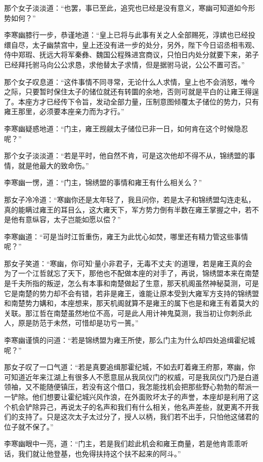 那个女子淡淡道：“也罢，事已至此，追究也已经是没有意义，寒幽可知道如今形势如何？”

李寒幽膝行一步，恭谨地道：“皇上已将与此事有关之人全部赐死，淳嫔也已经投缳自尽，太子幽禁宫中，皇上还没有进一步的处分，另外，陛下今日诏丞相韦观、侍中郑瑕、抚远大将军秦彝、魏国公程殊进宫商议，只怕日内处分就要下来，弟子已经拜托驸马向公公求恳，求他替太子求情，但是据驸马说，公公不置可否。”

那个女子叹息道：“这件事情不同寻常，无论什么人求情，皇上也不会消怒，唯今之际，只要暂时保住太子的储位就还有转圜的余地，否则可就是平白的让雍王得逞了。本座方才已经传下令旨，发动全部力量，压制意图倾覆太子储位的势力，只有雍王那里，必须要本座亲力而为才行。”

李寒幽疑惑地道：“门主，雍王觊觎太子储位已非一日，如何肯在这个时候隐忍呢？”

那个女子淡淡道：“若是平时，他自然不肯，可是这次他却不得不从，锦绣盟的事情，就是他最大的致命伤。”

李寒幽一愣，道：“门主，锦绣盟的事情和雍王有什么相关么？”

那女子冷冷道：“寒幽你还是太年轻了，我且问你，若是太子和锦绣盟勾连走私，真的能瞒过雍王的耳目么，这大雍天下，军方势力倒有半数在雍王掌握之中，若不是他有意纵容，太子岂能如愿以偿？”

李寒幽道：“可是当时江哲重伤，雍王为此忧心如焚，哪里还有精力管这些事情呢？”

那女子笑道：“寒幽，你可知‘量小非君子，无毒不丈夫’的道理，若是雍王真的会为了一个江哲就忘了天下，那他也不配做本座的对手了，再说，锦绣盟本来在南楚是千夫所指的叛逆，怎么有本事和南楚做起了生意，那天机阁虽然神秘莫测，可是它是南楚的势力却不会有错，若非是雍王，谁能让原本受到大雍军方支持的锦绣盟和南楚势力媾和，本座想来，那天机阁就算不是雍王的属下也是和雍王有着莫大的关联。那江哲在南楚虽然地位不高，可是此人用计神鬼莫测，我当初让你刺杀此人，原是防范于未然，可惜却是功亏一篑。”

李寒幽谨慎的问道：“若是锦绣盟为雍王所使，那么门主为什么却四处追缉霍纪城呢？”

那女子叹了一口气道：“若是真要追缉那霍纪城，不如去盯着雍王府那，寒幽，你可知道近年来江湖上有很多人不愿意屈从我凤仪门的权威，可是我凤仪门乃是白道领袖，又不能随便镇压，若没有这个借口，我怎能找机会把那些野心勃勃的帮派一一铲除。他们想要让霍纪城兴风作浪，在外面败坏太子的声誉，本座却是利用了这个机会铲除异己，再说太子的名声和我们有什么相关，他名声差些，就更离不开我们的支持了。只是这次太子太过分了，授人以柄，我们若不出手，只怕他这储君的位子就不保了。”

李寒幽眼中一亮，道：“门主，若是我们趁此机会和雍王商量，若是他肯乖乖听话，我们就让他登基，也免得扶持这个扶不起来的阿斗。”

